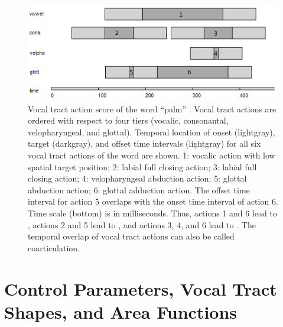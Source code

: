\documentclass[conference]{IEEEtran}
\let\ipa\textipa
\begin{document}
\begin{figure}[!t]
\centering
\includegraphics[width=\columnwidth]{actions}
\caption{Vocal tract action score of the word ``palm'' \ipa{[pAm]}. Vocal
  tract actions are ordered with respect to four tiers (vocalic,
  consonantal, velopharyngeal, and glottal). Temporal location of
  onset (lightgray), target (darkgray), and offset time intervals
  (lightgray) for all six vocal tract actions of the word are shown.
  1: vocalic action with low spatial target position; 2: labial full
  closing action; 3: labial full closing action; 4: velopharyngeal
  abduction action; 5: glottal abduction action; 6: glottal adduction
  action. The offset time interval for action 5 overlaps with the
  onset time interval of action 6. Time scale (bottom) is in milliseconds.
  Thus, actions 1 and 6 lead to \ipa{[A]}, actions 2 and 5 lead to \ipa{[p]}, and
  actions 3, 4, and 6 lead to \ipa{[m]}. The temporal overlap of vocal tract
  actions can also be called coarticulation.}
\label{fig:actions}
\end{figure}

\section{Control Parameters, Vocal Tract Shapes, and Area Functions}
\end{document}
